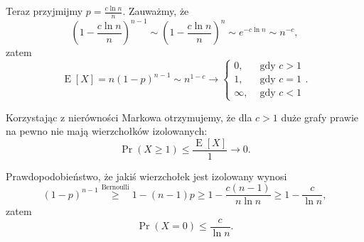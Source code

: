 \documentclass[a4paper, 12pt]{article}
\DeclareMathOperator{\EX}{E}
\begin{document}
Teraz przyjmijmy $p = \frac{c \ln n}{n}$.
Zauważmy, że
$$\left(1- \frac{c \ln n}{n}\right)^{n-1} \sim \left(1- \frac{c \ln n}{n}\right)^n \sim e^{-c \ln n} \sim n^{-c},$$
zatem
$$\EX[X] = n (1-p)^{n-1} \sim n^{1-c} →
\begin{cases}
	0, &\text{ gdy }c > 1 \\
	1, &\text{ gdy }c = 1 \\
	∞, &\text{ gdy }c < 1
\end{cases}.$$

Korzystając z nierówności Markowa otrzymujemy,
że dla $c > 1$ duże grafy prawie na pewno nie mają wierzchołków izolowanych:
$$\Pr(X ≥ 1) ≤ \frac{\EX[X]}{1} → 0.$$

Prawdopodobieństwo, że jakiś wierzchołek jest izolowany wynosi
$$(1-p)^{n-1} \stackrel{\text{Bernoulli}}{≥} 1-(n-1)p ≥ 1- \frac{c(n-1)}{n \ln n} ≥ 1 - \frac{c}{\ln n},$$
zatem
$$\Pr(X=0) ≤ \frac{c}{\ln n}.$$
\end{document}
